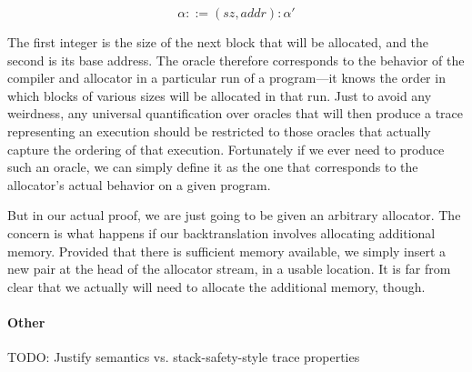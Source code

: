 \documentclass{article}
\begin{document}
\[\alpha ::= (\mathit{sz}, \mathit{addr}):\alpha'\]

The first integer is the size of the next block that will be allocated, and the second is its
base address. The oracle therefore corresponds to the behavior of the compiler and allocator
in a particular run of a program---it knows the order in which blocks of various sizes will be
allocated in that run. Just to avoid any weirdness, any universal quantification over oracles
that will then produce a trace representing an execution should be restricted to those oracles
that actually capture the ordering of that execution. Fortunately if we ever need to produce
such an oracle, we can simply define it as the one that corresponds to the allocator's actual
behavior on a given program.

But in our actual proof, we are just going to be given an arbitrary allocator. The concern is
what happens if our backtranslation involves allocating additional memory. Provided that there
is sufficient memory available, we simply insert a new pair at the head of the allocator stream,
in a usable location. It is far from clear that we actually will need to allocate the additional
memory, though.

\paragraph{Other}

TODO: Justify semantics vs. stack-safety-style trace properties
\end{document}
